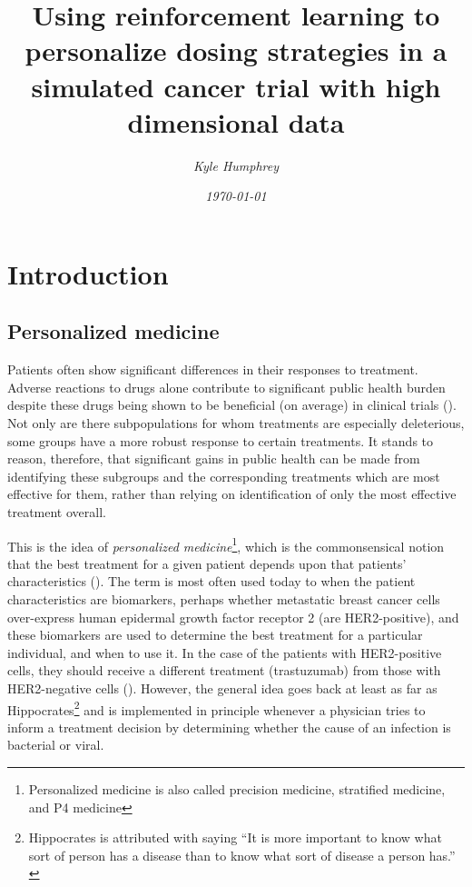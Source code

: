 \documentclass[12pt]{article}
\title{\normalfont \Large Using reinforcement learning to personalize dosing strategies in a simulated cancer trial with high dimensional data}
\author{\normalsize \sl Kyle Humphrey}
\date{\normalsize \sl \today}
\begin{document}
\maketitle

\tableofcontents
\listoffigures
\listoftables

\section{Introduction}

\subsection{Personalized medicine} %
\label{sub:personalized_medicine}


Patients often show significant differences in their responses to treatment. Adverse reactions to drugs alone contribute to significant public health burden despite these drugs being shown to be beneficial (on average) in clinical trials (\cite{Pirmohamed2004}). Not only are there subpopulations for whom treatments are especially deleterious, some groups have a more robust response to certain treatments. It stands to reason, therefore, that significant gains in public health can be made from identifying these subgroups and the corresponding treatments which are most effective for them, rather than relying on identification of only the most effective treatment overall.


This is the idea of \emph{personalized medicine}\footnote{Personalized medicine is also called precision medicine, stratified medicine, and P4 medicine}, which is the commonsensical notion that the best treatment for a given patient depends upon that patients' characteristics (\cite{pm-defn}). The term is most often used today to when the patient characteristics are biomarkers, perhaps whether metastatic breast cancer cells  over-express human epidermal growth factor receptor 2 (are HER2-positive), and these biomarkers are used to determine the best treatment for a particular individual, and when to use it. In the case of the patients with HER2-positive cells, they should receive a different treatment (trastuzumab) from those with HER2-negative cells (\cite{Baselga2006}).
However, the general idea goes back at least as far as Hippocrates\footnote{Hippocrates is attributed with saying “It is more important to know what sort of person has a disease than to know what sort of disease a person has.” \cite{Fischer2015}} and is implemented in principle whenever a physician tries to inform a treatment decision by determining whether the cause of an infection is bacterial or viral.
\end{document}
